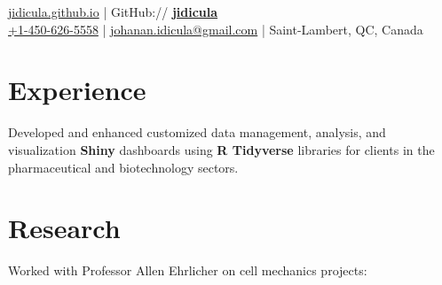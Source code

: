 \documentclass[]{jidicula-resume}
\begin{document}
% 
% 
\lastupdated



{ \href{http://bit.ly/jidicula_site}{jidicula.github.io}
  | GitHub:// \href{http://bit.ly/jidicula_github}{\bf jidicula} \\
  \href{tel:14506265558}{+1-450-626-5558}
  | \href{mailto:johanan.idicula+resume@gmail.com}{johanan.idicula@gmail.com}
  | Saint-Lambert, QC, Canada}

\begin{center}
  \huge\color{subheadings}
\end{center}

\section{Experience}

\vspace{\topsep} %
\begin{tightemize}
\item Developed and enhanced customized data management, analysis, and
  visualization \textbf{Shiny} dashboards using \textbf{R Tidyverse} libraries
  for clients in the pharmaceutical and biotechnology sectors.
\end{tightemize}
\sectionsep

\section{Research}
Worked with Professor Allen Ehrlicher on cell mechanics projects:
\end{document}
